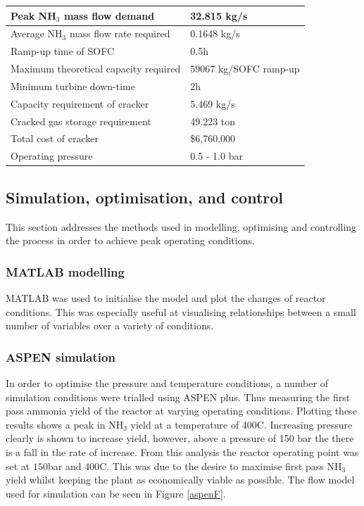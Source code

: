 \documentclass[11pt, a4paper]{article}
\newcommand\tc{400}
\newcommand\pbar{150}
\begin{document}
{\begin{table}[!htbp]
\begin{center}
\begin{tabular}{ |l|l|  }
			\hline
			Peak NH$_3$ mass flow demand & 32.815 kg/s\\
			\hline
			Average NH$_3$ mass flow rate required & 0.1648 kg/s\\
			\hline
			Ramp-up time of SOFC&  0.5h\\
			\hline
			Maximum theoretical capacity required& 59067 kg/SOFC ramp-up\\
			\hline
			Minimum turbine down-time    &2h \\
			\hline
			Capacity requirement of cracker& 5.469 kg/s\\
			\hline
			Cracked gas storage requirement & 49.223 ton \\
			\hline
			Total cost of cracker & \$6,760,000 \\
			\hline
			Operating pressure & 0.5 - 1.0 bar \\
			\hline
		\end{tabular}
	\end{center}
\end{table}


\subsection{Simulation, optimisation, and control}
This section addresses the methods used in modelling, optimising and controlling the process in order to achieve peak operating conditions.
\subsubsection{MATLAB modelling}
MATLAB was used to initialise the model and plot the changes of reactor conditions. This was especially useful at visualising relationships between a small number of variables over a variety of conditions.
\subsubsection{ASPEN simulation}
In order to optimise the pressure and temperature conditions, a number of simulation conditions were trialled using ASPEN plus. Thus measuring the first pass ammonia yield of the reactor at varying operating conditions. Plotting these results shows a peak in NH$_3$ yield at a temperature of 400\textdegree C. Increasing pressure clearly is shown to increase yield, however, above a pressure of 150 bar the there is a fall in the rate of increase. From this analysis the reactor operating point was set at $\pbar$bar and $\tc$\textdegree C. This was due to the desire to maximise first pass NH$_3$ yield whilst keeping the plant as economically viable as possible. The flow model used for simulation can be seen in Figure \ref{aspenF}.

}
\end{document}
